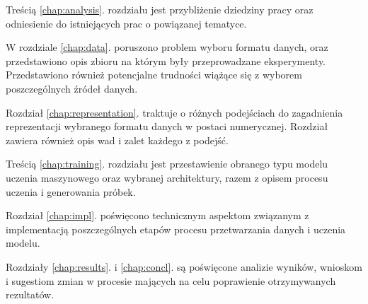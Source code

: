 {{        Treścią \ref{chap:analysis}. rozdziału jest przybliżenie dziedziny pracy oraz odniesienie do istniejących prac o powiązanej tematyce.
        
        W rozdziale \ref{chap:data}. poruszono problem wyboru formatu danych, oraz przedstawiono opis zbioru na którym
        były przeprowadzane eksperymenty. Przedstawiono również potencjalne trudności wiążące się z wyborem
        poszczególnych źródeł danych.

        Rozdział \ref{chap:representation}. traktuje o różnych podejściach do zagadnienia reprezentacji wybranego formatu 
        danych w postaci numerycznej. Rozdział zawiera również opis wad i zalet każdego z podejść.

        Treścią \ref{chap:training}. rozdziału jest przestawienie obranego typu modelu uczenia maszynowego oraz 
        wybranej architektury, razem z opisem procesu uczenia i generowania próbek.

        Rozdział \ref{chap:impl}. poświęcono technicznym aspektom związanym z implementacją poszczególnych etapów procesu 
        przetwarzania danych i uczenia modelu.

        Rozdziały \ref{chap:results}. i \ref{chap:concl}. są poświęcone analizie wyników, wnioskom i sugestiom zmian w procesie mających na celu 
        poprawienie otrzymywanych rezultatów.
    }
}


